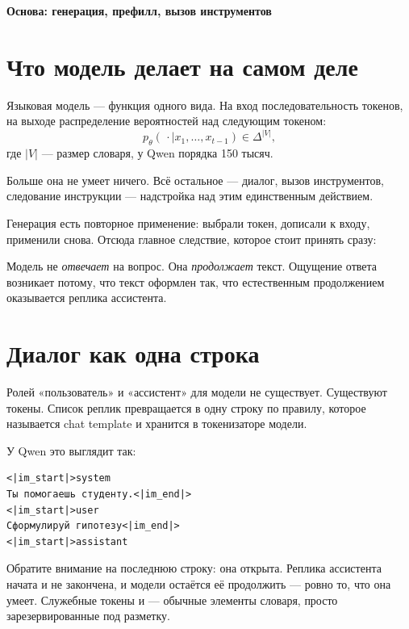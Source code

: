 \documentclass[11pt,a4paper]{article}
\begin{document}
{\Large\bfseries Основа: генерация, префилл, вызов инструментов}

\vspace{-0.5em}

\section{Что модель делает на самом деле}

Языковая модель — функция одного вида. На вход последовательность
токенов, на выходе распределение вероятностей над следующим токеном:
\[
p_\theta(\,\cdot \mid x_1,\dots,x_{t-1}) \in \Delta^{|V|},
\]
где $|V|$ — размер словаря, у Qwen порядка 150 тысяч.

Больше она не умеет ничего. Всё остальное — диалог, вызов инструментов,
следование инструкции — надстройка над этим единственным действием.

Генерация есть повторное применение: выбрали токен, дописали к входу,
применили снова. Отсюда главное следствие, которое стоит принять сразу:

\begin{keybox}
Модель не \emph{отвечает} на вопрос. Она \emph{продолжает} текст.
Ощущение ответа возникает потому, что текст оформлен так, что
естественным продолжением оказывается реплика ассистента.
\end{keybox}

\section{Диалог как одна строка}

Ролей «пользователь» и «ассистент» для модели не существует. Существуют
токены. Список реплик превращается в одну строку по правилу, которое
называется chat template и хранится в токенизаторе модели.

У Qwen это выглядит так:

\begin{Verbatim}
<|im_start|>system
Ты помогаешь студенту.<|im_end|>
<|im_start|>user
Сформулируй гипотезу<|im_end|>
<|im_start|>assistant
\end{Verbatim}

Обратите внимание на последнюю строку: она открыта. Реплика ассистента
начата и не закончена, и модели остаётся её продолжить — ровно то, что
она умеет. Служебные токены  и  —
обычные элементы словаря, просто зарезервированные под разметку.
\end{document}
